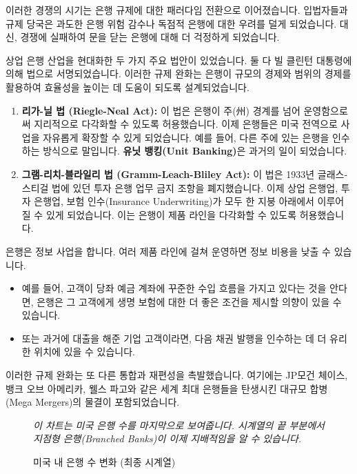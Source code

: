 \documentclass[11pt,a4paper]{book}
\theoremstyle{definition}
\begin{document}
이러한 경쟁의 시기는 은행 규제에 대한 패러다임 전환으로 이어졌습니다. 입법자들과 규제 당국은 과도한 은행 위험 감수나 독점적 은행에 대한 우려를 덜게 되었습니다. 대신, 경쟁에 실패하여 문을 닫는 은행에 대해 더 걱정하게 되었습니다.

상업 은행 산업을 현대화한 두 가지 주요 법안이 있었습니다. 둘 다 빌 클린턴 대통령에 의해 법으로 서명되었습니다. 이러한 규제 완화는 은행이 규모의 경제와 범위의 경제를 활용하여 효율성을 높이는 데 도움이 되도록 설계되었습니다.

\begin{enumerate}
    \item \textbf{리가-닐 법 (Riegle-Neal Act):}
    이 법은 은행이 주(州) 경계를 넘어 운영함으로써 지리적으로 다각화할 수 있도록 허용했습니다. 이제 은행들은 미국 전역으로 사업을 자유롭게 확장할 수 있게 되었습니다. 예를 들어, 다른 주에 있는 은행을 인수하는 방식으로 말입니다. \textbf{유닛 뱅킹(Unit Banking)}은 과거의 일이 되었습니다.

    \item \textbf{그램-리치-블라일리 법 (Gramm-Leach-Bliley Act):}
    이 법은 1933년 글래스-스티걸 법에 있던 투자 은행 업무 금지 조항을 폐지했습니다. 이제 상업 은행업, 투자 은행업, 보험 인수(Insurance Underwriting)가 모두 한 지붕 아래에서 이루어질 수 있게 되었습니다. 이는 은행이 제품 라인을 다각화할 수 있도록 허용했습니다.
\end{enumerate}

\begin{examplebox}[title={제품 라인 다각화의 이점: 정보 비용 절감}]
은행은 정보 사업을 합니다. 여러 제품 라인에 걸쳐 운영하면 정보 비용을 낮출 수 있습니다.
\begin{itemize}
    \item 예를 들어, 고객이 당좌 예금 계좌에 꾸준한 수입 흐름을 가지고 있다는 것을 안다면, 은행은 그 고객에게 생명 보험에 대한 더 좋은 조건을 제시할 의향이 있을 수 있습니다.
    \item 또는 과거에 대출을 해준 기업 고객이라면, 다음 채권 발행을 인수하는 데 더 유리한 위치에 있을 수 있습니다.
\end{itemize}
\end{examplebox}

이러한 규제 완화는 또 다른 통합과 재편성을 촉발했습니다. 여기에는 JP모건 체이스, 뱅크 오브 아메리카, 웰스 파고와 같은 세계 최대 은행들을 탄생시킨 대규모 합병(Mega Mergers)의 물결이 포함되었습니다.

\begin{figure}[h!]
    \centering
    \caption{미국 내 은행 수 변화 (최종 시계열)}
    \label{fig:us_banks_final}
    \textit{이 차트는 미국 은행 수를 마지막으로 보여줍니다. 시계열의 끝 부분에서 지점형 은행(Branched Banks)이 이제 지배적임을 알 수 있습니다.}
\end{figure}
\end{document}
